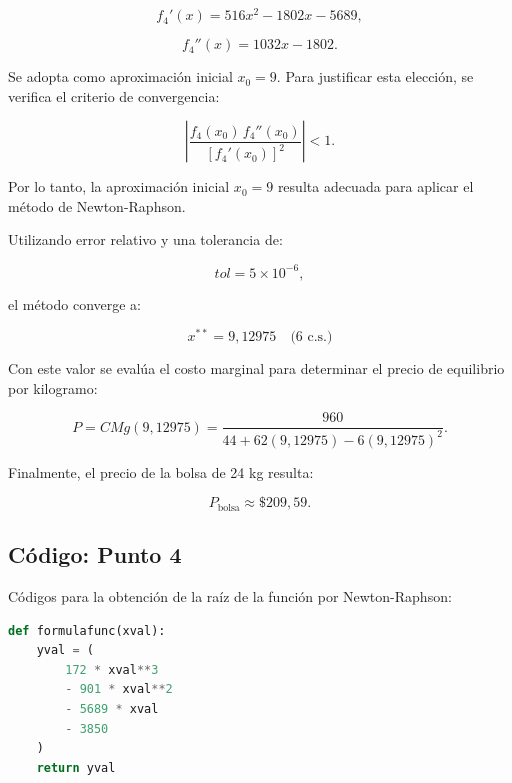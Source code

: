 \begin{equation}
    f_4'(x)
    =
    516x^2-1802x-5689,
\end{equation}

\begin{equation}
    f_4''(x)
    =
    1032x-1802.
\end{equation}

Se adopta como aproximación inicial $x_0=9$. Para justificar esta elección, se verifica el criterio de convergencia:

\begin{equation}
    \left|
    \frac{f_4(x_0)\,f_4''(x_0)}
    {[f_4'(x_0)]^2}
    \right|
    < 1.
\end{equation}

Por lo tanto, la aproximación inicial $x_0=9$ resulta adecuada para aplicar el método de Newton-Raphson.

Utilizando error relativo y una tolerancia de:

\begin{equation}
    tol = 5 \times 10^{-6},
\end{equation}

el método converge a:

\begin{equation}
    \boxed{x^{**}=9{,}12975 \quad \text{(6 c.s.)}}
\end{equation}

Con este valor se evalúa el costo marginal para determinar el precio de equilibrio por kilogramo:

\begin{equation}
    P
    =
    CMg(9{,}12975)
    =
    \frac{960}
    {44+62(9{,}12975)-6(9{,}12975)^2}.
\end{equation}

Finalmente, el precio de la bolsa de 24 kg resulta:

\begin{equation}
    \boxed{P_{\text{bolsa}}\approx \$209{,}59.}
\end{equation}

\subsection{Código: Punto 4}

Códigos para la obtención de la raíz de la función por Newton-Raphson:

\begin{lstlisting}[language=Python,frame=single,caption=Función cuya raíz desea calcularse,label={cod:funcp4}]
def formulafunc(xval):
    yval = (
        172 * xval**3
        - 901 * xval**2
        - 5689 * xval
        - 3850
    )
    return yval
\end{lstlisting}

